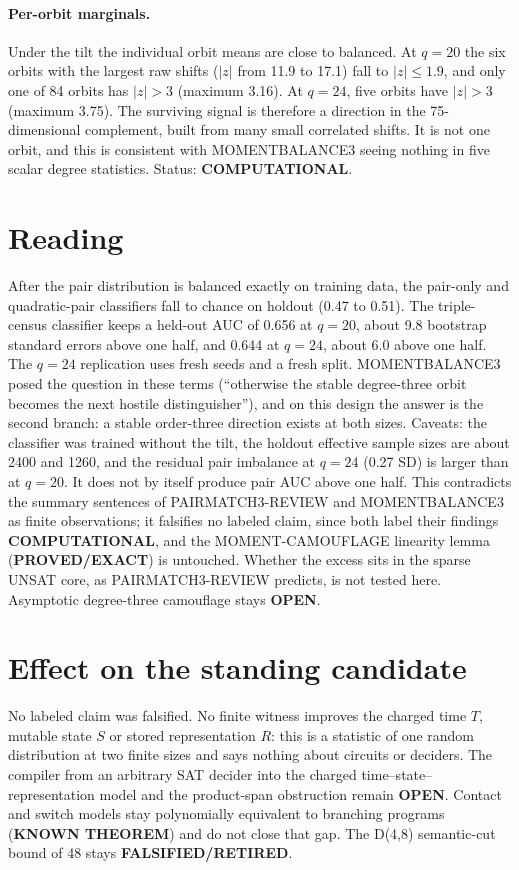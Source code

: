\documentclass[11pt]{article}
\begin{document}
\paragraph{Per-orbit marginals.} Under the tilt the individual orbit means are close to balanced. At $q=20$ the six orbits with the largest raw shifts ($|z|$ from 11.9 to 17.1) fall to $|z|\le1.9$, and only one of 84 orbits has $|z|>3$ (maximum 3.16). At $q=24$, five orbits have $|z|>3$ (maximum 3.75). The surviving signal is therefore a direction in the 75-dimensional complement, built from many small correlated shifts. It is not one orbit, and this is consistent with MOMENTBALANCE3 seeing nothing in five scalar degree statistics. Status: \textbf{COMPUTATIONAL}.

\section*{Reading}
After the pair distribution is balanced exactly on training data, the pair-only and quadratic-pair classifiers fall to chance on holdout (0.47 to 0.51). The triple-census classifier keeps a held-out AUC of 0.656 at $q=20$, about 9.8 bootstrap standard errors above one half, and 0.644 at $q=24$, about 6.0 above one half. The $q=24$ replication uses fresh seeds and a fresh split. MOMENTBALANCE3 posed the question in these terms (``otherwise the stable degree-three orbit becomes the next hostile distinguisher''), and on this design the answer is the second branch: a stable order-three direction exists at both sizes. Caveats: the classifier was trained without the tilt, the holdout effective sample sizes are about 2400 and 1260, and the residual pair imbalance at $q=24$ (0.27 SD) is larger than at $q=20$. It does not by itself produce pair AUC above one half. This contradicts the summary sentences of PAIRMATCH3-REVIEW and MOMENTBALANCE3 as finite observations; it falsifies no labeled claim, since both label their findings \textbf{COMPUTATIONAL}, and the MOMENT-CAMOUFLAGE linearity lemma (\textbf{PROVED/EXACT}) is untouched. Whether the excess sits in the sparse UNSAT core, as PAIRMATCH3-REVIEW predicts, is not tested here. Asymptotic degree-three camouflage stays \textbf{OPEN}.

\section*{Effect on the standing candidate}
No labeled claim was falsified. No finite witness improves the charged time $T$, mutable state $S$ or stored representation $R$: this is a statistic of one random distribution at two finite sizes and says nothing about circuits or deciders. The compiler from an arbitrary SAT decider into the charged time--state--representation model and the product-span obstruction remain \textbf{OPEN}. Contact and switch models stay polynomially equivalent to branching programs (\textbf{KNOWN THEOREM}) and do not close that gap. The D(4,8) semantic-cut bound of 48 stays \textbf{FALSIFIED/RETIRED}.
\end{document}
